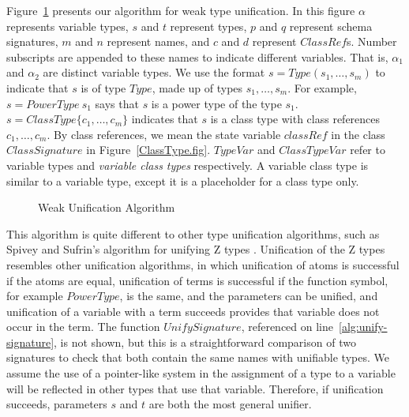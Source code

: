 Figure~\ref{weak-unification-algorithm} presents our algorithm for
weak type unification. In this figure $\alpha$ represents variable
types, $s$ and $t$ represent types, $p$ and $q$ represent schema
signatures, $m$ and $n$ represent names, and $c$ and $d$ represent
$ClassRef$s. Number subscripts are appended to these names to indicate
different variables. That is, $\alpha_1$ and $\alpha_2$ are distinct
variable types. We use the format $s = Type(s_1, \ldots, s_m)$ to
indicate that $s$ is of type $Type$, made up of types $s_1, \ldots,
s_m$. For example, $s = PowerType~s_1$ says that $s$ is a power type
of the type $s_1$. $s = ClassType \{c_1, \ldots, c_m\}$ indicates that
$s$ is a class type with class references $c_1, \ldots, c_m$. By class
references, we mean the state variable $classRef$ in the class
$ClassSignature$ in Figure~\ref{ClassType.fig}. $TypeVar$ and
$ClassTypeVar$ refer to variable types and {\em variable class types}
respectively. A variable class type is similar to a variable type,
except it is a placeholder for a class type only.

\begin{figure}

\caption{Weak Unification Algorithm}
\label{weak-unification-algorithm}
\end{figure}

%

This algorithm is quite different to other type unification
algorithms, such as Spivey and Sufrin's algorithm for unifying Z
types \cite{spivey90}. Unification of the Z types resembles other
unification algorithms, in which unification of atoms is successful if
the atoms are equal, unification of terms is successful if the
function symbol, for example $PowerType$, is the same, and the
parameters can be unified, and unification of a variable with a term
succeeds provides that variable does not occur in the term. The
function $UnifySignature$, referenced on
line~\ref{alg:unify-signature}, is not shown, but this is a
straightforward comparison of two signatures to check that both
contain the same names with unifiable types. We assume the use of a
pointer-like system in the assignment of a type to a variable will be
reflected in other types that use that variable. Therefore, if
unification succeeds, parameters $s$ and $t$ are both the most general
unifier.

